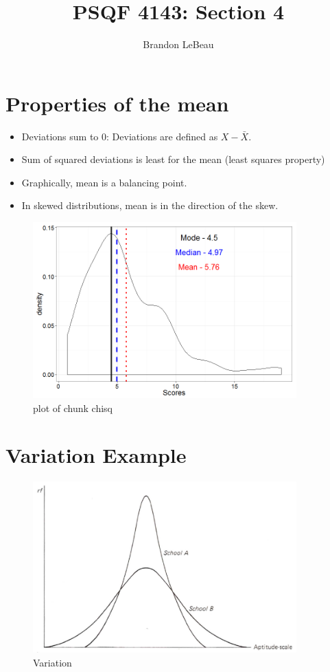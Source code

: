 \documentclass[12pt]{article}
\title{PSQF 4143: Section 4}
\author{Brandon LeBeau}
\date{}
\begin{document}
\maketitle

\section{Properties of the mean}\label{properties-of-the-mean}

\begin{itemize}
\itemsep1pt\parskip0pt
\item
  Deviations sum to 0: Deviations are defined as \(X-\bar{X}\).
\item
  Sum of squared deviations is least for the mean (least squares
  property)
\item
  Graphically, mean is a balancing point.
\item
  In skewed distributions, mean is in the direction of the skew.
\end{itemize}

\begin{figure}[H]
\centering
\includegraphics[width=4in]{figure/chisq-1.png}
\caption{plot of chunk chisq}
\end{figure}

\section{Variation Example}\label{variation-example}

\begin{figure}[H]
\centering
\includegraphics[width=4in]{Dispersion.png}
\caption{Variation}
\end{figure}
\end{document}
